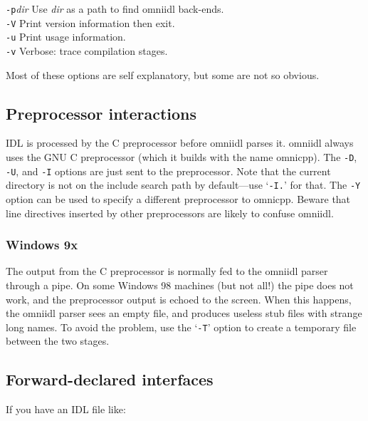 \documentclass[draft,11pt,twoside,a4paper]{book}
\newcommand{\cmdline}[1]{\texttt{#1}}
\begin{document}
\begin{tabbing}
\cmdline{-p}\textit{dir}
     \> Use \textit{dir} as a path to find omniidl back-ends.\\

\cmdline{-V}
     \> Print version information then exit.\\

\cmdline{-u}
     \> Print usage information.\\

\cmdline{-v}
     \> Verbose: trace compilation stages.\\

\end{tabbing}

\noindent Most of these options are self explanatory, but some are not
so obvious.

\subsection{Preprocessor interactions}

IDL is processed by the C preprocessor before omniidl parses it.
omniidl always uses the GNU C preprocessor (which it builds with the
name omnicpp). The \cmdline{-D}, \cmdline{-U}, and \cmdline{-I}
options are just sent to the preprocessor. Note that the current
directory is not on the include search path by default---use
`\cmdline{-I.}' for that. The \cmdline{-Y} option can be used to
specify a different preprocessor to omnicpp. Beware that line
directives inserted by other preprocessors are likely to confuse
omniidl.

\subsubsection{Windows 9x}

The output from the C preprocessor is normally fed to the omniidl
parser through a pipe. On some Windows 98 machines (but not all!)  the
pipe does not work, and the preprocessor output is echoed to the
screen. When this happens, the omniidl parser sees an empty file, and
produces useless stub files with strange long names. To avoid the
problem, use the `\cmdline{-T}' option to create a temporary file
between the two stages.


\subsection{Forward-declared interfaces}

If you have an IDL file like:
\end{document}
